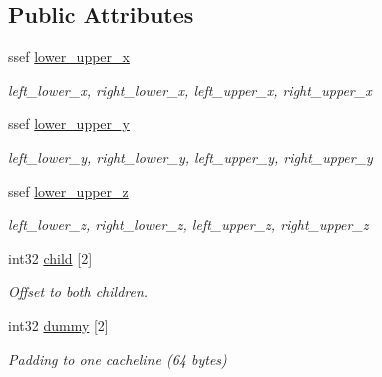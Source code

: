 \subsection*{Public Attributes}
\begin{DoxyCompactItemize}
\item 
\hypertarget{structembree_1_1_b_v_h2_1_1_node_ae7baaf42c200bcb460390230aa06f168}{
ssef \hyperlink{structembree_1_1_b_v_h2_1_1_node_ae7baaf42c200bcb460390230aa06f168}{lower\_\-upper\_\-x}}
\label{structembree_1_1_b_v_h2_1_1_node_ae7baaf42c200bcb460390230aa06f168}

\begin{DoxyCompactList}\small\item\em left\_\-lower\_\-x, right\_\-lower\_\-x, left\_\-upper\_\-x, right\_\-upper\_\-x \item\end{DoxyCompactList}\item 
\hypertarget{structembree_1_1_b_v_h2_1_1_node_ac82637262749c3d28e28093109ea4a41}{
ssef \hyperlink{structembree_1_1_b_v_h2_1_1_node_ac82637262749c3d28e28093109ea4a41}{lower\_\-upper\_\-y}}
\label{structembree_1_1_b_v_h2_1_1_node_ac82637262749c3d28e28093109ea4a41}

\begin{DoxyCompactList}\small\item\em left\_\-lower\_\-y, right\_\-lower\_\-y, left\_\-upper\_\-y, right\_\-upper\_\-y \item\end{DoxyCompactList}\item 
\hypertarget{structembree_1_1_b_v_h2_1_1_node_a9af5124be172a0476106dc247375b3ce}{
ssef \hyperlink{structembree_1_1_b_v_h2_1_1_node_a9af5124be172a0476106dc247375b3ce}{lower\_\-upper\_\-z}}
\label{structembree_1_1_b_v_h2_1_1_node_a9af5124be172a0476106dc247375b3ce}

\begin{DoxyCompactList}\small\item\em left\_\-lower\_\-z, right\_\-lower\_\-z, left\_\-upper\_\-z, right\_\-upper\_\-z \item\end{DoxyCompactList}\item 
int32 \hyperlink{structembree_1_1_b_v_h2_1_1_node_a016e6c98b42539d721e00b811062f7b0}{child} \mbox{[}2\mbox{]}
\begin{DoxyCompactList}\small\item\em Offset to both children. \item\end{DoxyCompactList}\item 
\hypertarget{structembree_1_1_b_v_h2_1_1_node_abb13971a84067966bca39107a3e8ad91}{
int32 \hyperlink{structembree_1_1_b_v_h2_1_1_node_abb13971a84067966bca39107a3e8ad91}{dummy} \mbox{[}2\mbox{]}}
\label{structembree_1_1_b_v_h2_1_1_node_abb13971a84067966bca39107a3e8ad91}

\begin{DoxyCompactList}\small\item\em Padding to one cacheline (64 bytes) \item\end{DoxyCompactList}\end{DoxyCompactItemize}


